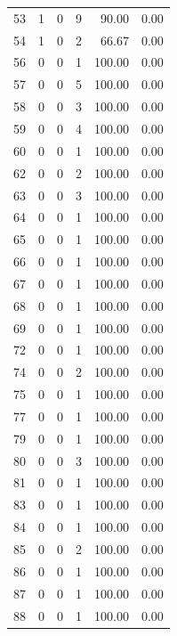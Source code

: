\documentclass[11pt]{article}
\begin{document}
\begin{longtable}{r|r|r|r|r|r}
    53    & 1     & 0     & 9     & 90.00 & 0.00\\
    54    & 1     & 0     & 2     & 66.67 & 0.00\\
    56    & 0     & 0     & 1     & 100.00 & 0.00 \\
    57    & 0     & 0     & 5     & 100.00 & 0.00 \\
    58    & 0     & 0     & 3     & 100.00 & 0.00 \\
    59    & 0     & 0     & 4     & 100.00 & 0.00 \\
    60    & 0     & 0     & 1     & 100.00 & 0.00 \\
    62    & 0     & 0     & 2     & 100.00 & 0.00 \\
    63    & 0     & 0     & 3     & 100.00 & 0.00 \\
    64    & 0     & 0     & 1     & 100.00 & 0.00 \\
    65    & 0     & 0     & 1     & 100.00 & 0.00 \\
    66    & 0     & 0     & 1     & 100.00 & 0.00 \\
    67    & 0     & 0     & 1     & 100.00 & 0.00 \\
    68    & 0     & 0     & 1     & 100.00 & 0.00 \\
    69    & 0     & 0     & 1     & 100.00 & 0.00 \\
    72    & 0     & 0     & 1     & 100.00 & 0.00 \\
    74    & 0     & 0     & 2     & 100.00 & 0.00 \\
    75    & 0     & 0     & 1     & 100.00 & 0.00 \\
    77    & 0     & 0     & 1     & 100.00 & 0.00 \\
    79    & 0     & 0     & 1     & 100.00 & 0.00 \\
    80    & 0     & 0     & 3     & 100.00 & 0.00 \\
    81    & 0     & 0     & 1     & 100.00 & 0.00 \\
    83    & 0     & 0     & 1     & 100.00 & 0.00 \\
    84    & 0     & 0     & 1     & 100.00 & 0.00 \\
    85    & 0     & 0     & 2     & 100.00 & 0.00 \\
    86    & 0     & 0     & 1     & 100.00 & 0.00 \\
    87    & 0     & 0     & 1     & 100.00 & 0.00 \\
    88    & 0     & 0     & 1     & 100.00 & 0.00 \\

\end{longtable}
\end{document}
